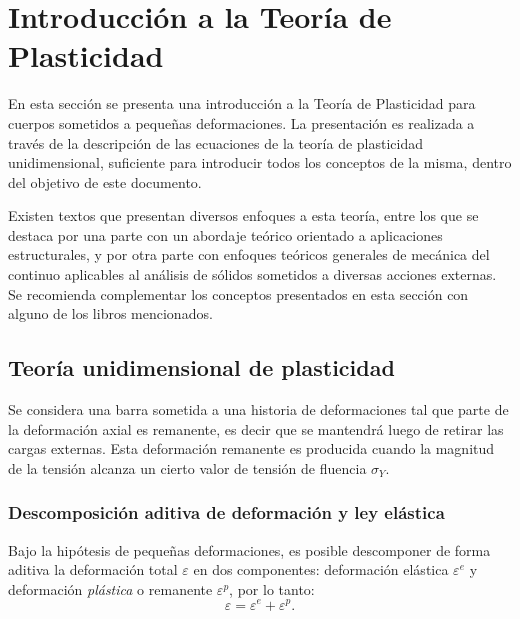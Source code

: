 \section{Introducción a la Teoría de Plasticidad}

En esta sección se presenta una introducción a la Teoría de Plasticidad para cuerpos sometidos a pequeñas deformaciones. %
%
La presentación es realizada a través de la descripción de las ecuaciones de la teoría de plasticidad unidimensional, suficiente para introducir todos los conceptos de la misma, dentro del objetivo de este documento.

Existen textos que presentan diversos enfoques a esta teoría, entre los que se destaca por una parte \citep{Jirasek2001} con un abordaje teórico orientado a aplicaciones estructurales, y por otra parte \citep{DeSouzaNeto2008,Taroco2017,Simo1998} con enfoques teóricos generales de mecánica del continuo aplicables al análisis de sólidos sometidos a diversas acciones externas. %
%
Se recomienda complementar los conceptos presentados en esta sección con alguno de los libros mencionados.

\subsection{Teoría unidimensional de plasticidad}

Se considera una barra sometida a una historia de deformaciones tal que parte de la deformación axial es remanente, es decir que se mantendrá luego de retirar las cargas externas. %
%
Esta deformación remanente es producida cuando la magnitud de la tensión alcanza un cierto valor de tensión de fluencia $\sigma_Y$.

\subsubsection{Descomposición aditiva de deformación y ley elástica}
Bajo la hipótesis de pequeñas deformaciones, es posible descomponer de forma aditiva la deformación total $\varepsilon$ en dos componentes: deformación elástica $\varepsilon^e$ y deformación \textit{plástica} o remanente $\varepsilon^p$, por lo tanto:
%
\begin{equation}
\varepsilon = \varepsilon^e + \varepsilon^p.
\end{equation}
%

